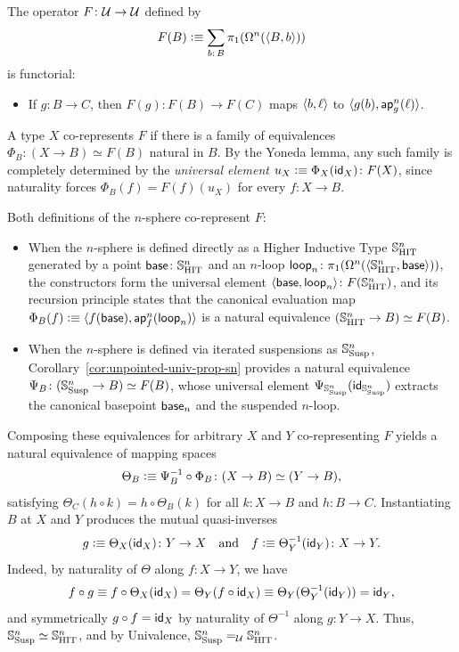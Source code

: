 \begin{rem}\label{rem:yoneda-sn}
    The operator $F\colon\univ\to\univ$ defined by
    \[
        F(B)\defeq\sum_{b\colon B}
            \pi_1(\Omega^n(\dep{B,b}))
    \]
    is functorial:
    \begin{itemize}
        \item If $g\colon B\to C$, then $F(g)\colon F(B)\to F(C)$ maps $\langle b,\ell\rangle$ to $\langle g(b),\mathsf{ap}^n_g(\ell)\rangle$. 
    \end{itemize}
    A type $X$ co-represents $F$ if there is a family of equivalences $\Phi_B\colon (X\to B)\simeq F(B)$ natural in $B$. By the Yoneda lemma, any such family is completely determined by the \textsl{universal element} $u_X\defeq\Phi_X(\fun{id}_X)\colon F(X)$, since naturality forces $\Phi_B(f) = F(f)(u_X)$ for every $f\colon X\to B$.

    Both definitions of the $n$-sphere co-represent $F$:
    \begin{itemize}
        \item When the $n$-sphere is defined directly as a Higher Inductive Type $\mathbb S^n_{\text{HIT}}$ generated by a point $\fun{base}\colon\sphere^n_{\text{HIT}}$ and an $n$-loop $\fun{loop}_n\colon\pi_1(\Omega^n(\dep{\sphere^n_{\text{HIT}},\fun{base}}))$, the constructors form the universal element $\dep{\fun{base},\fun{loop}_n}\colon F(\sphere^n_{\text{HIT}})$, and its recursion principle states that the canonical evaluation map $\Phi_B(f)\mathrel{\vcentcolon}\equiv\langle f(\mathsf{base}),\mathsf{ap}^n_f(\mathsf{loop}_n)\rangle$ is a natural equivalence $(\mathbb S^n_{\text{HIT}}\to B)\simeq F(B)$.
        \item When the $n$-sphere is defined via iterated suspensions as $\mathbb S^n_{\text{Susp}}$, Corollary~\ref{cor:unpointed-univ-prop-sn} provides a natural equivalence $\Psi_B\colon (\sphere^n_{\text{Susp}}\to B)\simeq F(B)$, whose universal element $\Psi_{\mathbb S^n_{\text{Susp}}}(\mathsf{id}_{\mathbb S^n_{\text{Susp}}})$ extracts the canonical basepoint $\mathsf{base}_n$ and the suspended $n$-loop.
    \end{itemize}

    Composing these equivalences for arbitrary $X$ and $Y$ co-representing $F$ yields a natural equivalence of mapping spaces
    \[
        \Theta_B \defeq \Psi_B^{-1}\circ\Phi_B\colon (X\to B)\simeq (Y\to B),
    \]
    satisfying $\Theta_C(h\circ k) = h\circ\Theta_B(k)$ for all $k\colon X\to B$ and $h\colon B\to C$. Instantiating $B$ at $X$ and $Y$ produces the mutual quasi-inverses
    \[
        g \defeq \Theta_X(\fun{id}_X)\colon Y\to X
        \quad\text{and}\quad
        f \defeq \Theta_Y^{-1}(\fun{id}_Y)\colon X\to Y.
    \]
    Indeed, by naturality of $\Theta$ along $f\colon X\to Y$, we have
    \[
        f\circ g \equiv f\circ\Theta_X(\mathsf{id}_X) = \Theta_Y(f\circ\mathsf{id}_X) \equiv \Theta_Y(\Theta_Y^{-1}(\mathsf{id}_Y)) = \mathsf{id}_Y,
    \]
    and symmetrically $g\circ f = \mathsf{id}_X$ by naturality of $\Theta^{-1}$ along $g\colon Y\to X$. Thus, $\mathbb S^n_{\text{Susp}}\simeq\mathbb S^n_{\text{HIT}}$, and by Univalence, $\mathbb S^n_{\text{Susp}}\mathrel{=_{\mathcal U}}\mathbb S^n_{\text{HIT}}$.
\end{rem}

